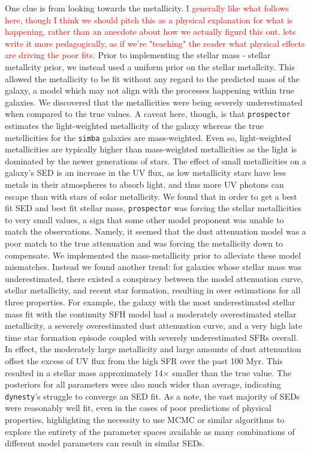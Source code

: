 \documentclass[twocolumn]{aastex62}
\newcommand{\red}[1]{{\textcolor{red}{#1}}}
\begin{document}
One clue is from looking towards the metallicity. \red{I generally like what follows here, though I think we should pitch this as a physical explanation for what is happening, rather than an anecdote about how we actually figurd this out.  lets write it more pedagogically, as if we're "teaching" the reader what physical effects are driving the poor fits.} Prior to implementing the \cite{gallazzi_ages_2005} stellar mass - stellar metallcity prior, we instead used a uniform prior on the stellar metallcity. This allowed the metallicity to be fit without any regard to the predicted mass of the galaxy, a model which may not align with the processes happening within true galaxies. We discovered that the metallicities were being severely underestimated when compared to the true values. A caveat here, though, is that \texttt{prospector} estimates the light-weighted metallicity of the galaxy whereas the true metellicities for the \texttt{simba} galaxies are mass-weighted. Even so, light-weighted metallicities are typically higher than mass-weighted metallicities as the light is dominated by the newer generations of stars. The effect of small metallicities on a galaxy's SED is an increase in the UV flux, as low metallicity stars have less metals in their atmospheres to absorb light, and thus more UV photons can escape than with stars of solar metallicity. We found that in order to get a best fit SED and best fit stellar mass, \texttt{prospector} was forcing the stellar metallicities to very small values, a sign that some other model proponent was unable to match the observations. Namely, it seemed that the dust attenuation model was a poor match to the true attenuation and was forcing the metallicity down to compensate. We implemented the \cite{gallazzi_ages_2005} mass-metallicity prior to alleviate these model mismatches. Instead we found another trend: for galaxies whose stellar mass was underestimated, there existed a conspiracy between the model attenuation curve, stellar metallicity, and recent star formation, resulting in over estimations for all three properties. For example, the galaxy with the most underestimated stellar mass fit with the continuity SFH model had a moderately overestimated stellar metallicity, a severely overestimated dust attenuation curve, and a very high late time star formation episode coupled with severely underestimated SFRs overall. In effect, the moderately large metallicity and large amounts of dust attenuation offset the excess of UV flux from the high SFR over the past 100 Myr.  This resulted in a stellar mass approximately 14$\times$ smaller than the true value. The posteriors for all parameters were also much wider than average, indicating \texttt{dynesty}'s struggle to converge an SED fit. As a note, the vast majority of SEDs were reasonably well fit, even in the cases of poor predictions of physical properties, highlighting the necessity to use MCMC or similar algorithms to explore the entirety of the parameter spaces available as many combinations of different model parameters can result in similar SEDs. 
\end{document}
